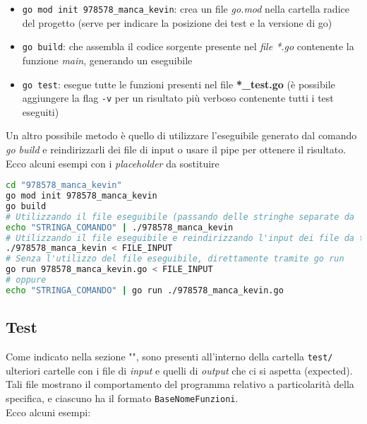 \documentclass{article}
\begin{document}
\begin{itemize}
  \item{\texttt{go mod init 978578\_manca\_kevin}}: crea un file \textit{go.mod} nella cartella radice del progetto (serve per indicare la posizione dei test e la versione di go)\\
  \item{\texttt{go build}}: che assembla il codice sorgente presente nel \textit{file *.go} contenente la funzione \textit{main}, generando un eseguibile\\ 
  \item{\texttt{go test}}: esegue tutte le funzioni presenti nel file \textbf{*\_test.go} (è possibile aggiungere la flag \texttt{-v} per un risultato più verboso contenente tutti i test eseguiti)\\

\end{itemize}
Un altro possibile metodo è quello di utilizzare l'eseguibile generato dal comando \textit{go build} e reindirizzarli dei file di input o usare il pipe per ottenere il risultato.
\\
Ecco alcuni esempi con i \textit{placeholder} da sostituire
\begin{lstlisting}[language=bash, caption=Comandi shell, basicstyle=\small]
cd "978578_manca_kevin"
go mod init 978578_manca_kevin
go build
# Utilizzando il file eseguibile (passando delle stringhe separate da '\n')
echo "STRINGA_COMANDO" | ./978578_manca_kevin
# Utilizzando il file eseguibile e reindirizzando l'input dei file da testare
./978578_manca_kevin < FILE_INPUT
# Senza l'utilizzo del file eseguibile, direttamente tramite go run
go run 978578_manca_kevin.go < FILE_INPUT
# oppure
echo "STRINGA_COMANDO" | go run ./978578_manca_kevin.go
\end{lstlisting}

\subsection{Test}
Come indicato nella sezione "", sono presenti all'interno della cartella \texttt{test/} ulteriori cartelle con i file di \textit{input} e quelli di \textit{output} che ci si aspetta (expected).\\
Tali file mostrano il comportamento del programma relativo a particolarità della specifica, e ciascuno ha il formato \texttt{BaseNomeFunzioni}.\\
Ecco alcuni esempi:\\
\end{document}

